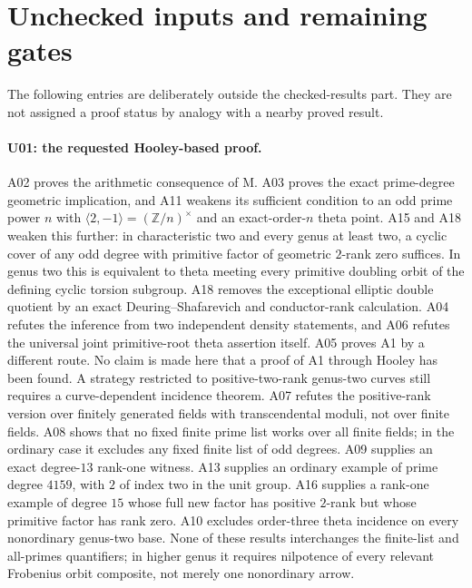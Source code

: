 \documentclass[11pt,a4paper]{article}
\begin{document}
\section{Unchecked inputs and remaining gates}
\label{sec:remaining}

The following entries are deliberately outside the checked-results
part. They are not assigned a proof status by analogy with a nearby
proved result.

\paragraph{U01: the requested Hooley-based proof.}
A02 proves the arithmetic consequence of M. A03 proves the exact
prime-degree geometric implication, and A11 weakens its sufficient
condition to an odd prime power $n$ with
$\langle2,-1\rangle=(\mathbb Z/n)^\times$ and an exact-order-$n$
theta point. A15 and A18 weaken this further: in characteristic two and every
genus at least two, a cyclic cover of any odd degree with primitive
factor of geometric $2$-rank zero suffices. In genus two this is
equivalent to theta meeting every primitive doubling orbit of the
defining cyclic torsion subgroup. A18 removes the exceptional
elliptic double quotient by an exact Deuring--Shafarevich and
conductor-rank calculation.
A04 refutes the inference from
two independent density statements, and A06 refutes the universal
joint primitive-root theta assertion itself. A05 proves A1 by a
different route. No claim is made here that a proof of A1 through
Hooley has been found. A strategy restricted to positive-two-rank
genus-two curves still requires a curve-dependent incidence theorem.
A07 refutes the positive-rank version over finitely generated fields
with transcendental moduli, not over finite fields. A08 shows that
no fixed finite prime list works over all finite fields; in the
ordinary case it excludes any fixed finite list of odd degrees.
A09 supplies an exact degree-$13$ rank-one witness. A13 supplies an
ordinary example of prime degree $4159$, with $2$ of index two in
the unit group. A16 supplies a rank-one example of degree $15$
whose full new factor has positive $2$-rank but whose primitive
factor has rank zero. A10 excludes order-three theta incidence on every nonordinary
genus-two base. None of
these results interchanges the finite-list and all-primes quantifiers;
in higher genus it requires nilpotence of every relevant Frobenius
orbit composite, not merely one nonordinary arrow.
\end{document}
